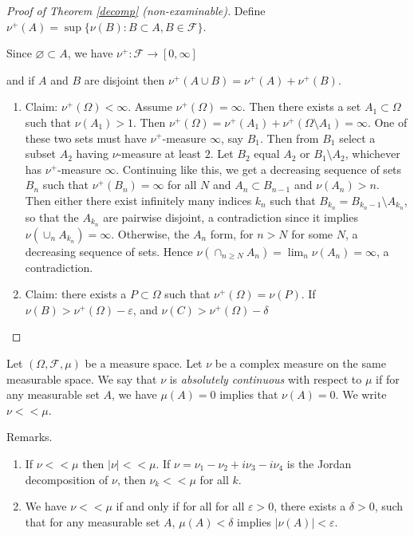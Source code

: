 \begin{proof}[Proof of Theorem \ref{decomp} (non-examinable)]
Define $\nu^+(A)=\sup\{\nu(B):B\subset A,B\in\mathcal{F}\}$.

Since $\varnothing\subset A$, we have $\nu^+:\mathcal{F}\to[0,\infty]$

and if $A$ and $B$ are disjoint then $\nu^+(A\cup B)=\nu^+(A)+\nu^+(B)$.
\begin{enumerate}
  \item Claim: $\nu^+(\Omega)<\infty$.
  Assume $\nu^+(\Omega)=\infty$. Then there exists a set $A_1\subset \Omega$ such that $\nu(A_1)>1$.
  Then $\nu^+(\Omega)=\nu^+(A_1)+\nu^+(\Omega\setminus A_1)=\infty$.
  One of these two sets must have $\nu^+$-measure $\infty$, say $B_1$.
  Then from $B_1$ select a subset $A_2$ having $\nu$-measure at least $2$.
  Let $B_2$ equal $A_2$ or $B_1\setminus A_2$, whichever has $\nu^+$-measure $\infty$.
  Continuing like this, we get a decreasing sequence of sets $B_n$
  such that $\nu^+(B_n)=\infty$ for all $N$
  and $A_n\subset B_{n-1}$ and $\nu(A_n)>n$.
  Then either there exist infinitely many indices $k_n$ such that $B_{k_n}=B_{k_n-1}\setminus A_{k_n}$,
  so that the $A_{k_n}$ are pairwise disjoint,
  a contradiction since it implies $\nu(\cup_n A_{k_n})=\infty$.
  Otherwise, the $A_n$ form, for $n>N$ for some $N$,
  a decreasing sequence of sets.
  Hence $\nu(\cap_{n\geq N}A_n)=\lim_{n} \nu(A_n)=\infty$,
  a contradiction.
  \item Claim: there exists a $P\subset\Omega$ such that $\nu^+(\Omega)=\nu(P)$.
  If $\nu(B)>\nu^+(\Omega)-\varepsilon$,
  and $\nu(C)>\nu^+(\Omega)-\delta$
\end{enumerate}
\end{proof}

Let $(\Omega,\mathcal{F},\mu)$ be a measure space. Let $\nu$ be a complex measure on the same measurable space.
We say that $\nu$ is \emph{absolutely continuous} with respect to $\mu$ if for any measurable set $A$,
we have $\mu(A)=0$ implies that $\nu(A)=0$.
We write $\nu<<\mu$.

Remarks.
\begin{enumerate}
  \item If $\nu<<\mu$ then $|\nu|<<\mu$.
  If $\nu=\nu_1-\nu_2+i\nu_3-i\nu_4$ is the Jordan decomposition of $\nu$,
  then $\nu_k<<\mu$ for all $k$.
  \item We have $\nu<<\mu$ if and only if for all
  for all $\varepsilon>0$, there exists a $\delta>0$,
  such that for any measurable set $A$, $\mu(A)<\delta$ implies $|\nu(A)|<\varepsilon$.
\end{enumerate}

